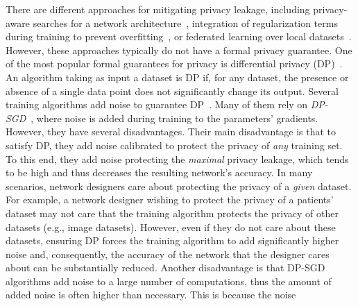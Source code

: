 There are different approaches for mitigating privacy leakage, including privacy-aware searches for a network architecture~\cite{ref_16,ref_17}, integration of regularization terms during training to prevent overfitting~\cite{ref_18, ref_19}, %
or federated learning over local datasets~\cite{ref_34,ref_57}. However, these approaches typically do not have a formal privacy guarantee. 
One of the most popular formal guarantees for privacy is 
differential privacy (DP)~\cite{Dwork06}. 
An algorithm taking as input a dataset is DP if, for any dataset,
 the presence or absence of a single data point does not significantly change its output. 
Several training algorithms add noise to guarantee DP~\cite{ref_22,ref_36,ref_37,ref_58,ref_59,ref_60,ref_61,ref_62}.  
Many of them rely on \emph{DP-SGD}~\citep{ref_22,ref_36,ref_37,ref_58}, where noise is added during training to the parameters' gradients.  
However, %
they have several disadvantages.
Their main disadvantage is that to satisfy DP, they add noise calibrated to protect the privacy of \emph{any} training set. To this end, they add noise protecting the \emph{maximal} privacy leakage, which tends to be high and thus decreases the resulting network's accuracy. 
In many scenarios, network designers care about protecting the privacy of a \emph{given} dataset.
For example, a network designer wishing to protect the privacy of a patients' dataset may not care that the training algorithm protects the privacy of other datasets (e.g., image datasets). 
However, even if they do not care about these datasets, ensuring DP forces the training algorithm
to add significantly higher noise and, consequently, the accuracy of the network that the designer cares about can be substantially reduced. 
Another disadvantage is that DP-SGD algorithms add noise to a large number of computations, thus %
the amount of added noise is often higher than necessary.  %
This is because the noise %

